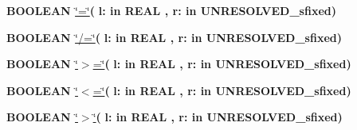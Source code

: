 \begin{DoxyCompactItemize}
\item 
{\bfseries {\bfseries \textcolor{comment}{B\+O\+O\+L\+E\+A\+N}\textcolor{vhdlchar}{ }}} \hyperlink{class__fixed__pkg_a7949e9258ea0749e3b35961feea8db87}{\char`\"{}=\char`\"{}}{\bfseries  ( }{\bfseries \textcolor{vhdlchar}{l\+: }\textcolor{stringliteral}{in }{\bfseries \textcolor{comment}{R\+E\+A\+L}\textcolor{vhdlchar}{ }}}{\bfseries  , \textcolor{vhdlchar}{r\+: }\textcolor{stringliteral}{in }\textcolor{vhdlchar}{U\+N\+R\+E\+S\+O\+L\+V\+E\+D\+\_\+sfixed}}{\bfseries  )} 
\item 
{\bfseries {\bfseries \textcolor{comment}{B\+O\+O\+L\+E\+A\+N}\textcolor{vhdlchar}{ }}} \hyperlink{class__fixed__pkg_a00087aded97b434060226b9ba63a9077}{\char`\"{}/=\char`\"{}}{\bfseries  ( }{\bfseries \textcolor{vhdlchar}{l\+: }\textcolor{stringliteral}{in }{\bfseries \textcolor{comment}{R\+E\+A\+L}\textcolor{vhdlchar}{ }}}{\bfseries  , \textcolor{vhdlchar}{r\+: }\textcolor{stringliteral}{in }\textcolor{vhdlchar}{U\+N\+R\+E\+S\+O\+L\+V\+E\+D\+\_\+sfixed}}{\bfseries  )} 
\item 
{\bfseries {\bfseries \textcolor{comment}{B\+O\+O\+L\+E\+A\+N}\textcolor{vhdlchar}{ }}} \hyperlink{class__fixed__pkg_a4cd07e388cdbb3996dd11f56781d3758}{\char`\"{}$>$=\char`\"{}}{\bfseries  ( }{\bfseries \textcolor{vhdlchar}{l\+: }\textcolor{stringliteral}{in }{\bfseries \textcolor{comment}{R\+E\+A\+L}\textcolor{vhdlchar}{ }}}{\bfseries  , \textcolor{vhdlchar}{r\+: }\textcolor{stringliteral}{in }\textcolor{vhdlchar}{U\+N\+R\+E\+S\+O\+L\+V\+E\+D\+\_\+sfixed}}{\bfseries  )} 
\item 
{\bfseries {\bfseries \textcolor{comment}{B\+O\+O\+L\+E\+A\+N}\textcolor{vhdlchar}{ }}} \hyperlink{class__fixed__pkg_a65b73a94d4fe541a941f431175b342b7}{\char`\"{}$<$=\char`\"{}}{\bfseries  ( }{\bfseries \textcolor{vhdlchar}{l\+: }\textcolor{stringliteral}{in }{\bfseries \textcolor{comment}{R\+E\+A\+L}\textcolor{vhdlchar}{ }}}{\bfseries  , \textcolor{vhdlchar}{r\+: }\textcolor{stringliteral}{in }\textcolor{vhdlchar}{U\+N\+R\+E\+S\+O\+L\+V\+E\+D\+\_\+sfixed}}{\bfseries  )} 
\item 
{\bfseries {\bfseries \textcolor{comment}{B\+O\+O\+L\+E\+A\+N}\textcolor{vhdlchar}{ }}} \hyperlink{class__fixed__pkg_ac6c82329bf849852be997a3d0a737cf9}{\char`\"{}$>$\char`\"{}}{\bfseries  ( }{\bfseries \textcolor{vhdlchar}{l\+: }\textcolor{stringliteral}{in }{\bfseries \textcolor{comment}{R\+E\+A\+L}\textcolor{vhdlchar}{ }}}{\bfseries  , \textcolor{vhdlchar}{r\+: }\textcolor{stringliteral}{in }\textcolor{vhdlchar}{U\+N\+R\+E\+S\+O\+L\+V\+E\+D\+\_\+sfixed}}{\bfseries  )} 

\end{DoxyCompactItemize}
